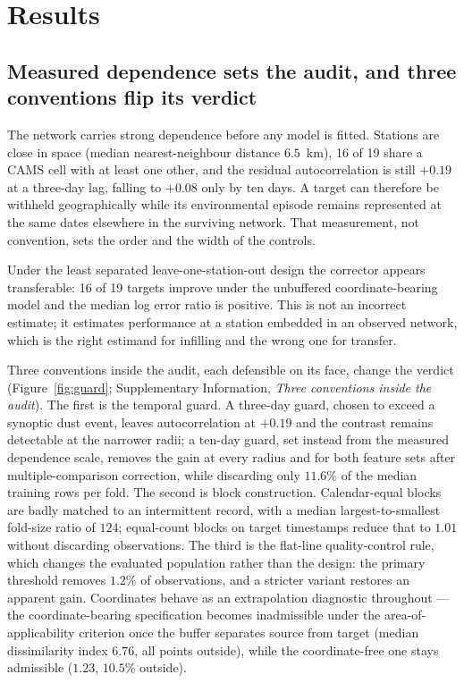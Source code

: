 \section{Results}

\subsection{Measured dependence sets the audit, and three conventions flip its verdict}

The network carries strong dependence before any model is fitted. Stations are close in space
(median nearest-neighbour distance $6.5$~km), 16 of 19 share a CAMS cell with at least one other,
and the residual autocorrelation is still $+0.19$ at a three-day lag, falling to $+0.08$ only by
ten days. A target can therefore be withheld geographically while its environmental episode remains
represented at the same dates elsewhere in the surviving network. That measurement, not convention,
sets the order and the width of the controls.

Under the least separated leave-one-station-out design the corrector appears transferable: 16 of 19
targets improve under the unbuffered coordinate-bearing model and the median log error ratio is
positive. This is not an incorrect estimate; it estimates performance at a station embedded in an
observed network, which is the right estimand for infilling and the wrong one for transfer.

Three conventions inside the audit, each defensible on its face, change the verdict
(Figure~\ref{fig:guard}; Supplementary Information, \emph{Three conventions inside the audit}). The first is the temporal guard. A
three-day guard, chosen to exceed a synoptic dust event, leaves autocorrelation at $+0.19$ and the
contrast remains detectable at the narrower radii; a ten-day guard, set instead from the measured
dependence scale, removes the gain at every radius and for both feature sets after
multiple-comparison correction, while discarding only $11.6\%$ of the median training rows per
fold. The second is block construction. Calendar-equal blocks are badly matched to an intermittent
record, with a median largest-to-smallest fold-size ratio of $124$; equal-count blocks on target
timestamps reduce that to $1.01$ without discarding observations. The third is the flat-line
quality-control rule, which changes the evaluated population rather than the design: the primary
threshold removes $1.2\%$ of observations, and a stricter variant restores an apparent gain.
Coordinates behave as an extrapolation diagnostic throughout --- the coordinate-bearing
specification becomes inadmissible under the area-of-applicability criterion once the buffer
separates source from target (median dissimilarity index $6.76$, all points outside), while the
coordinate-free one stays admissible ($1.23$, $10.5\%$ outside).

